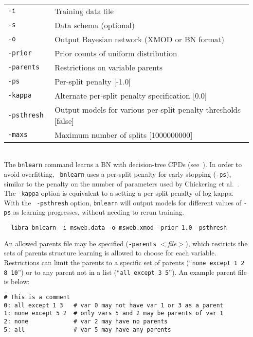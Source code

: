 \documentclass[11pt]{article}
\begin{document}
\noindent {} \\
\begin{tabular}{ll}
  {\tt -i        } &  Training data file \\
  {\tt -s        } &  Data schema (optional) \\
  {\tt -o        } &  Output Bayesian network (XMOD or BN format) \\
  {\tt -prior    } &  Prior counts of uniform distribution \\
  {\tt -parents  } &  Restrictions on variable parents \\
  {\tt -ps       } &  Per-split penalty [-1.0] \\
  {\tt -kappa    } &  Alternate per-split penalty specification [0.0] \\
  {\tt -psthresh } &  Output models for various per-split penalty thresholds [false] \\
  {\tt -maxs     } &  Maximum number of splits [1000000000] \\
\end{tabular} \\

The {\tt bnlearn} command learns a BN with decision-tree CPDs
(see~\cite{chickering&al97}).  In order to avoid overfitting, {\tt
bnlearn} uses a per-split penalty for early stopping ({\tt -ps}),
similar to the penalty on the number of parameters used by Chickering
et al.~\cite{chickering&al97}.  The {\tt -kappa} option is equivalent
to a setting a per-split penalty of log kappa.  With the {\tt
-psthresh} option, {\tt bnlearn} will output models for different
values of {\tt -ps} as learning progresses, without needing to rerun
training.
\begin{verbatim}
  libra bnlearn -i msweb.data -o msweb.xmod -prior 1.0 -psthresh
\end{verbatim}

An allowed parents file may be specified ({\tt -parents} {\em $<$file$>$}),
which restricts the sets of parents structure learning is allowed to choose for
each variable.  Restrictions can limit the parents to a specific set of parents
(``{\tt none except 1 2 8 10}'') or to any parent not in a list (``{\tt all
except 3 5}'').  An example parent file is below:
\begin{verbatim}
# This is a comment
0: all except 1 3   # var 0 may not have var 1 or 3 as a parent
1: none except 5 2  # only vars 5 and 2 may be parents of var 1
2: none             # var 2 may have no parents
5: all              # var 5 may have any parents
\end{verbatim}
\end{document}
